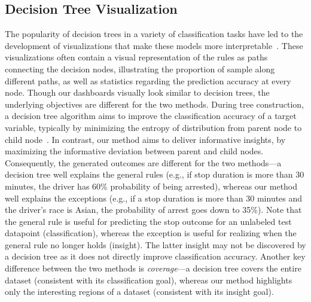 \subsection{Decision Tree Visualization}
The popularity of decision trees in a variety of classification tasks have led to the development of visualizations that make these models more interpretable~\cite{Ankerst1999,Hermann2017,Terence2018}. These visualizations often contain a visual representation of the rules as paths connecting the decision nodes, illustrating the proportion of sample along different paths, as well as statistics regarding the prediction accuracy at every node. Though our dashboards visually look similar to decision trees, the underlying objectives are different for the two methods. During tree construction, a decision tree algorithm aims to improve the classification accuracy of a target variable, typically by minimizing the entropy of distribution from parent node to child node~\cite{Quinlan1986}. In contrast, our method aims to deliver informative insights, by maximizing the informative deviation between parent and child nodes. Consequently, the generated outcomes are different for the two methods---a decision tree well explains the general rules (e.g., if stop duration is more than 30 minutes, the driver has 60\% probability of being arrested), whereas our method well explains the exceptions (e.g., if a stop duration is more than 30 minutes and the driver's race is Asian, the probability of arrest goes down to 35\%). Note that the general rule is useful for predicting the stop outcome for an unlabeled test datapoint (classification), whereas the exception is useful for realizing when the general rule no longer holds (insight). The latter insight may not be discovered by a decision tree as it does not directly improve classification accuracy. Another key difference between the two methods is \emph{coverage}---a decision tree covers the entire dataset (consistent with its classification goal), whereas our method highlights only the interesting regions of a dataset (consistent with its insight goal).


